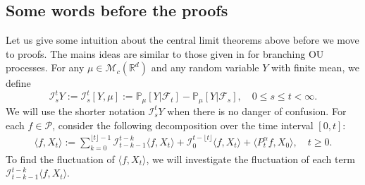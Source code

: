 \documentclass[12pt,a4paper]{amsart}
\theoremstyle{plain}
\theoremstyle{definition}
\numberwithin{equation}{section}
\begin{document}
\subsection{Some words before the proofs}
Let us give some intuition about the central limit theorems above before we move to proofs.  
The mains ideas are similar to those given in \cite{MarksMilos2018CLT} for branching OU processes.
For any $\mu\in  \mathcal M_c(\mathbb R^d)$ and any random variable $Y$ with finite mean, we define
\begin{equation}\label{Ist}
    \mathcal I_s^t Y:=\mathcal I_s^t [Y, \mu]
    := \mathbb P_\mu[Y|\mathscr F_t] - \mathbb P_\mu[Y|\mathscr F_s],\quad 0 \leq s \leq t <\infty.
\end{equation}
    We will use the shorter notation $\mathcal I_s^t Y$ when there is no danger of confusion. 
    For each $f\in \mathcal{P}$, consider the following decomposition over the time interval $[0,t]$:
\begin{align}
       \langle f,X_t\rangle
        :=\sum_{k=0}^{\lfloor t \rfloor-1} \mathcal I_{t-k-1}^{t-k}\langle f ,X_t\rangle+\mathcal I_0^{t-\lfloor t \rfloor}\langle f ,X_t\rangle +
         \langle P^\alpha_tf,X_0\rangle,
               \quad t\geq 0.
\end{align}
   To find the fluctuation of $\langle f,X_t\rangle$, we will investigate the fluctuation of each term $\mathcal I_{t-k-1}^{t-k}\langle f ,X_t\rangle$.
\end{document}
